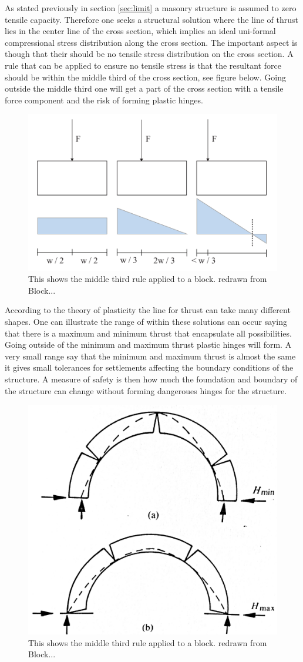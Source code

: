 As stated previously in section \ref{sec:limit} a masonry structure is assumed to zero tensile capacity. Therefore one seeks a structural solution where the line of thrust lies in the center line of the cross section, which implies an ideal uni-formal compressional stress distribution along the cross section. The important aspect is though that their should be no tensile stress distribution on the cross section. A rule that can be applied to ensure no tensile stress is that the resultant force should be within the middle third of the cross section, see figure below. Going outside the middle third one will get a part of the cross section with a tensile force component and the risk of forming plastic hinges.  

\begin{figure}[H]
\centering
\includegraphics[width=0.9\linewidth ]{figure/Theory/Safety.pdf}
\caption{This shows the middle third rule applied to a block. redrawn from Block...}
\end{figure}

According to the theory of plasticity the line for thrust can take many different shapes. One can illustrate the range of within these solutions can occur saying that there is a maximum and minimum thrust that encapsulate all possibilities. Going outside of the minimum and maximum thrust plastic hinges will form. A very small range say that the minimum and maximum thrust is almost the same it gives small tolerances for settlements affecting the boundary conditions of the structure. A measure of safety is then how much the foundation and boundary of the structure can change without forming dangeroues hinges for the structure.

\begin{figure}[H]
\centering
\includegraphics[width=0.5\linewidth ]{figure/Theory/minmaxthrust.pdf}
\caption{This shows the middle third rule applied to a block. redrawn from Block...}
\end{figure}

